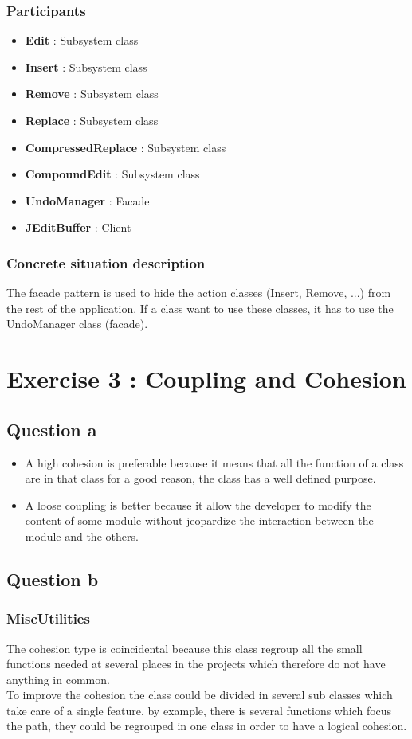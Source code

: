 \documentclass[a4paper,10pt]{article}
\begin{document}
\subsubsection[Participants]{Participants\footnotemark[1]}
\begin{itemize}
 \item \textbf{Edit} : Subsystem class
 \item \textbf{Insert} : Subsystem class
 \item \textbf{Remove} : Subsystem class
 \item \textbf{Replace} : Subsystem class
 \item \textbf{CompressedReplace} : Subsystem class
 \item \textbf{CompoundEdit} : Subsystem class
 \item \textbf{UndoManager} : Facade
 \item \textbf{JEditBuffer} : Client
\end{itemize}

\subsubsection{Concrete situation description}
The facade pattern is used to hide the action classes (Insert, Remove, ...) from the rest of the application. If a class want to use these classes, it has to use the UndoManager class (facade).

\section{Exercise 3 : Coupling and Cohesion}
\subsection{Question a}
\begin{itemize}
\item A high cohesion is preferable because it means that all the function of a class are in that class for a good reason, the class has a well defined purpose.
\item A loose coupling is better because it allow the developer to modify the content of some module without jeopardize the interaction between the module and the others.
\end{itemize}
\subsection{Question b}
\subsubsection{MiscUtilities}
The cohesion type is coincidental because this class regroup all the small functions needed at several places in the projects which therefore do not have anything in common.\\
To improve the cohesion the class could be divided in several sub classes which take care of a single feature, by example, there is several functions which focus the path, they could be regrouped in one class in order to have a logical cohesion.
\end{document}
